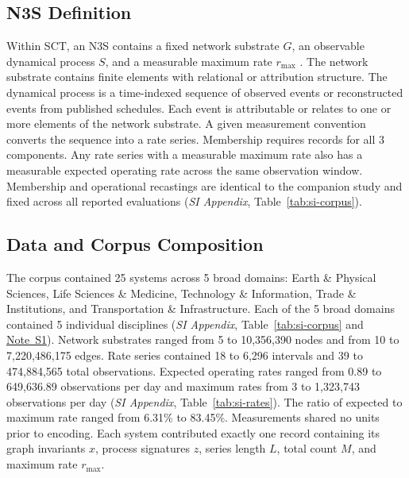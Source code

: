 \documentclass{article}
\begin{document}
\subsection*{N3S Definition}
Within SCT, an N3S contains a fixed network substrate $G$, an observable dynamical process $S$, and a measurable maximum rate $r_{\max}$ \citep{ref122}. The network substrate contains finite elements with relational or attribution structure. The dynamical process is a time-indexed sequence of observed events or reconstructed events from published schedules. Each event is attributable or relates to one or more elements of the network substrate. A given measurement convention converts the sequence into a rate series. Membership requires records for all 3 components. Any rate series with a measurable maximum rate also has a measurable expected operating rate across the same observation window. Membership and operational recastings are identical to the companion study and fixed across all reported evaluations (\textit{SI Appendix}, Table~\ref{tab:si-corpus}).

\subsection*{Data and Corpus Composition}
The corpus contained 25 systems across 5 broad domains: Earth \& Physical Sciences, Life Sciences \& Medicine, Technology \& Information, Trade \& Institutions, and Transportation \& Infrastructure. Each of the 5 broad domains contained 5 individual disciplines (\textit{SI Appendix}, Table~\ref{tab:si-corpus} and \hyperref[sec:si-note-processing]{Note~S1}). Network substrates ranged from 5 to 10,356,390 nodes and from 10 to 7,220,486,175 edges. Rate series contained 18 to 6,296 intervals and 39 to 474,884,565 total observations. Expected operating rates ranged from 0.89 to 649,636.89 observations per day and maximum rates from 3 to 1,323,743 observations per day (\textit{SI Appendix}, Table~\ref{tab:si-rates}). The ratio of expected to maximum rate ranged from 6.31\% to 83.45\%. Measurements shared no units prior to encoding. Each system contributed exactly one record containing its graph invariants $x$, process signatures $z$, series length $L$, total count $M$, and maximum rate $r_{\max}$.
\end{document}

